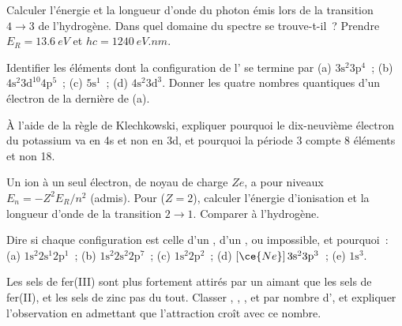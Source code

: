 \begin{exercise}[$\star\star$]\label{exo:b1:quantum-numbers:7}
Calculer l'énergie et la longueur d'onde du photon émis lors de la
transition $4 \to 3$ de l'hydrogène. Dans quel domaine du spectre se
trouve-t-il~? Prendre $E_R = \qty{13.6}{eV}$ et $hc = \qty{1240}{eV.nm}$.
\end{exercise}

\begin{exercise}[$\star\star$]\label{exo:b1:quantum-numbers:8}
Identifier les éléments dont la configuration de l' se
termine par
(a) $3\text{s}^2 3\text{p}^4$~; (b) $4\text{s}^2 3\text{d}^{10} 4\text{p}^5$~;
(c) $5\text{s}^1$~; (d) $4\text{s}^2 3\text{d}^3$. Donner les quatre
nombres quantiques d'un électron de la dernière  de (a).
\end{exercise}

\begin{exercise}[$\star\star$]\label{exo:b1:quantum-numbers:9}
À l'aide de la règle de Klechkowski, expliquer pourquoi le
dix-neuvième électron du potassium va en 4s et non en 3d, et pourquoi la
période 3 compte 8 éléments et non 18.
\end{exercise}

\begin{exercise}[$\star\star\star$]\label{exo:b1:quantum-numbers:10}
Un ion à un seul électron, de noyau de charge $Ze$, a pour niveaux
$E_n = -Z^2 E_R/n^2$ (admis). Pour  ($Z = 2$), calculer
l'énergie d'ionisation et la longueur d'onde de la transition $2 \to 1$.
Comparer à l'hydrogène.
\end{exercise}

\begin{exercise}[$\star\star\star$]\label{exo:b1:quantum-numbers:11}
Dire si chaque configuration est celle d'un , d'un , ou impossible, et pourquoi~: (a) $1\text{s}^2 2\text{s}^1 2\text{p}^1$~;
(b) $1\text{s}^2 2\text{s}^2 2\text{p}^7$~; (c) $1\text{s}^2 2\text{p}^2$~;
(d) $[\ce{Ne}]\,3\text{s}^2 3\text{p}^3$~; (e) $1\text{s}^3$.
\end{exercise}

\begin{exercise}[$\star\star\star$]\label{exo:b1:quantum-numbers:12}
Les sels de fer(III) sont plus fortement attirés par un aimant que les
sels de fer(II), et les sels de zinc pas du tout. Classer
, , ,  et 
par nombre d', et expliquer l'observation en
admettant que l'attraction croît avec ce nombre.
\end{exercise}

